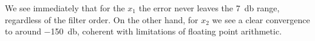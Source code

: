 We see immediately that for the \(x_1\) the error never leaves the
\SI{7}{\decibel} range, regardless of the filter order. On the other hand, for
\(x_2\) we see a clear convergence to around \SI{-150}{\decibel}, coherent with
limitations of floating point arithmetic.

